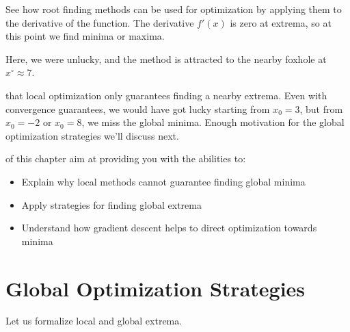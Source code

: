 \vspace{1.5em}
See how root finding methods can be used for optimization by applying them to the derivative of the function.
The derivative $f'(x)$ is zero at extrema, so at this point we find minima or maxima.


Here, we were unlucky, and the method is attracted to the nearby foxhole at $x^{\circ} \approx 7$.


 that local optimization only guarantees finding a nearby extrema. 
Even with convergence guarantees, we would have got lucky starting from $x_0 = 3$, but from $x_0 = -2$ or $x_0 = 8$, we miss the global minima. 
Enough motivation for the global optimization strategies we'll discuss next.



\vspace{2.5em}
 of this chapter aim at providing you with the abilities to:
\begin{itemize}
    \item Explain why local methods cannot guarantee finding global minima
    \item Apply strategies for finding global extrema
    \item Understand how gradient descent helps to direct optimization towards minima
\end{itemize}












\newpage


\section{Global Optimization Strategies}
 

Let us formalize local and global extrema.

